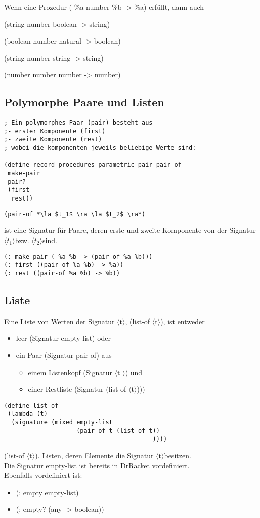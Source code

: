 \documentclass[a4paper,12pt]{article}
\newcommand{\la}{$\langle$}
\newcommand{\ra}{$\rangle$}
\begin{document}
Wenn eine Prozedur ( \%a number  \%b -> \%a) erfüllt, dann auch 

(string number boolean -> string)

(boolean number natural -> boolean)

(string number string -> string)

(number number number -> number)
\newpage
\subsection{Polymorphe Paare und Listen}
\begin{lstlisting}[style=customc]
; Ein polymorphes Paar (pair) besteht aus
;- erster Komponente (first)
;- zweite Komponente (rest)
; wobei die komponenten jeweils beliebige Werte sind:

(define record-procedures-parametric pair pair-of
 make-pair
 pair?
 (first
  rest))
\end{lstlisting}
\begin{lstlisting}
(pair-of *\la $t_1$ \ra \la $t_2$ \ra*)
\end{lstlisting}
ist eine Signatur für Paare, deren erste und zweite Komponente von der Signatur \la $t_1$\ra bzw. \la $t_2$\ra sind.
\begin{lstlisting}[style=customc]
(: make-pair ( %a %b -> (pair-of %a %b)))
(: first ((pair-of %a %b) -> %a))
(: rest ((pair-of %a %b) -> %b))
\end{lstlisting}
\subsection{Liste}
Eine \uline{Liste} von Werten der Signatur \la t\ra, (list-of \la t\ra), ist entweder
\begin{itemize}
\item leer (Signatur empty-list) oder
\item ein Paar (Signatur pair-of) aus 
\begin{itemize}
\item einem Listenkopf (Signatur \la t \ra) und
\item einer Restliste (Signatur (list-of \la t\ra)))
\end{itemize}
\end{itemize}
\begin{lstlisting}[style=customc]
(define list-of
 (lambda (t)
  (signature (mixed empty-list
                    (pair-of t (list-of t))
                                         ))))
\end{lstlisting}
(list-of \la t\ra). Listen, deren Elemente die Signatur \la t\ra besitzen.\\
Die Signatur empty-list ist bereits in DrRacket vordefiniert. \\Ebenfalls vordefiniert ist:
\begin{itemize}[-]
\item (: empty empty-list)
\item (: empty? (any -> boolean))
\end{itemize}
\end{document}
